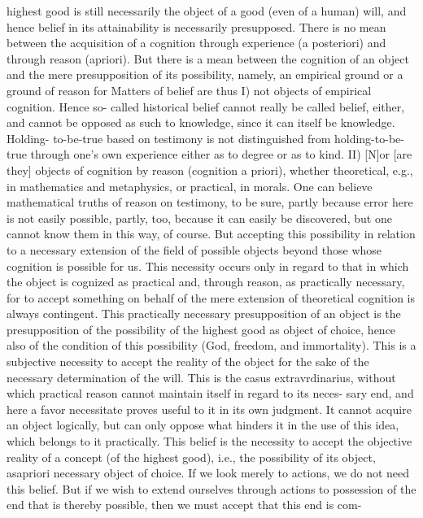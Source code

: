 highest good is still necessarily the object of a good (even of a human) will, and hence belief
in its attainability is necessarily presupposed.
There is no mean between the acquisition of a cognition through experience (a posteriori)
and through reason (apriori). But there is a mean between the cognition of an object and the
mere presupposition of its possibility, namely, an empirical ground or a ground of reason for
Matters of belief are thus I) not objects of empirical cognition. Hence so-
called historical belief cannot really be called belief, either, and cannot be
opposed as such to knowledge, since it can itself be knowledge. Holding-
to-be-true based on testimony is not distinguished from holding-to-be-
true through one's own experience either as to degree or as to kind.
II) [N]or [are they] objects of cognition by reason (cognition a priori),
whether theoretical, e.g., in mathematics and metaphysics, or practical, in
morals.
One can believe mathematical truths of reason on testimony, to be sure,
partly because error here is not easily possible, partly, too, because it can
easily be discovered, but one cannot know them in this way, of course. But
accepting this possibility in relation to a necessary extension of the field of possible objects
beyond those whose cognition is possible for us. This necessity occurs only in regard to that
in which the object is cognized as practical and, through reason, as practically necessary, for
to accept something on behalf of the mere extension of theoretical cognition is always
contingent. This practically necessary presupposition of an object is the presupposition of the
possibility of the highest good as object of choice, hence also of the condition of this
possibility (God, freedom, and immortality). This is a subjective necessity to accept the
reality of the object for the sake of the necessary determination of the will. This is the casus
extravrdinarius, without which practical reason cannot maintain itself in regard to its neces-
sary end, and here a favor necessitate proves useful to it in its own judgment. It cannot acquire
an object logically, but can only oppose what hinders it in the use of this idea, which belongs
to it practically.
This belief is the necessity to accept the objective reality of a concept (of the highest
good), i.e., the possibility of its object, asapriori necessary object of choice. If we look merely
to actions, we do not need this belief. But if we wish to extend ourselves through actions to
possession of the end that is thereby possible, then we must accept that this end is com-

